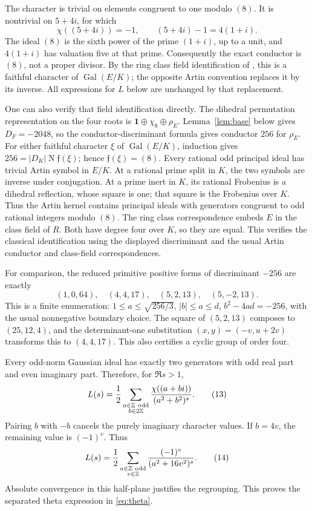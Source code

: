 \documentclass[11pt]{article}
\newcommand{\Z}{\mathbb Z}
\newcommand{\Gal}{\operatorname{Gal}}
\newcommand{\N}{\operatorname N}
\begin{document}
The character is trivial on elements congruent to one modulo $(8)$.
It is nontrivial on $5+4i$, for which
\[
 \chi((5+4i))=-1,\qquad (5+4i)-1=4(1+i).
 \tag{11}\label{eq:conductor-witness}
\]
The ideal $(8)$ is the sixth power of the prime $(1+i)$, up to a unit,
and $4(1+i)$ has valuation five at that prime. Consequently the exact
conductor is $(8)$, not a proper divisor.
By the ring class field identification of
\citet[Lemma~3.8]{WilliamsLiu1994}, this is a faithful character of
$\Gal(E/K)$; the opposite Artin convention replaces it by its inverse.
All expressions for $L$ below are unchanged by that replacement.

One can also verify that field identification directly. The dihedral
permutation representation on the four roots is
$\boldsymbol1\oplus\chi_8\oplus\rho_E$.
Lemma~\ref{lem:base} below gives $D_F=-2048$, so the
conductor-discriminant formula gives conductor $256$ for $\rho_E$.
For either faithful character $\xi$ of $\Gal(E/K)$, induction gives
$256=|D_K|\N\mathfrak f(\xi)$; hence
$\mathfrak f(\xi)=(8)$. Every rational odd principal ideal has trivial
Artin symbol in $E/K$. At a rational prime split in $K$, the two symbols
are inverse under conjugation. At a prime inert in $K$, its rational
Frobenius is a dihedral reflection, whose square is one; that square is
the Frobenius over $K$. Thus the Artin kernel contains principal ideals
with generators congruent to odd rational integers modulo $(8)$.
The ring class correspondence embeds $E$ in the class field of $R$.
Both have degree four over $K$, so they are equal. This verifies the
classical identification using the displayed discriminant and the
usual Artin conductor and class-field correspondences.

For comparison, the reduced primitive positive forms of discriminant
$-256$ are exactly
\[
 (1,0,64),\quad(4,4,17),\quad(5,2,13),\quad(5,-2,13).
 \tag{12}\label{eq:forms}
\]
This is a finite enumeration: $1\le a\le\sqrt{256/3}$,
$|b|\le a\le d$, $b^2-4ad=-256$, with the usual nonnegative boundary
choice. The square of $(5,2,13)$ composes to $(25,12,4)$, and the
determinant-one substitution $(x,y)=(-v,u+2v)$ transforms this to
$(4,4,17)$. This also certifies a cyclic group of order four.

Every odd-norm Gaussian ideal has exactly two generators with odd real
part and even imaginary part. Therefore, for $\Re s>1$,
\[
 L(s)=\frac12\sum_{\substack{a\in\Z\ {\rm odd}\\b\in2\Z}}
       \frac{\chi((a+bi))}{(a^2+b^2)^s}.
 \tag{13}\label{eq:gaussian-series}
\]
Pairing $b$ with $-b$ cancels the purely imaginary character values.
If $b=4v$, the remaining value is $(-1)^v$. Thus
\[
 L(s)=\frac12\sum_{\substack{a\in\Z\ {\rm odd}\\v\in\Z}}
            \frac{(-1)^v}{(a^2+16v^2)^s}.
 \tag{14}\label{eq:separated-series}
\]
Absolute convergence in this half-plane justifies the regrouping.
This proves the separated theta expression in \eqref{eq:theta}.
\end{document}
